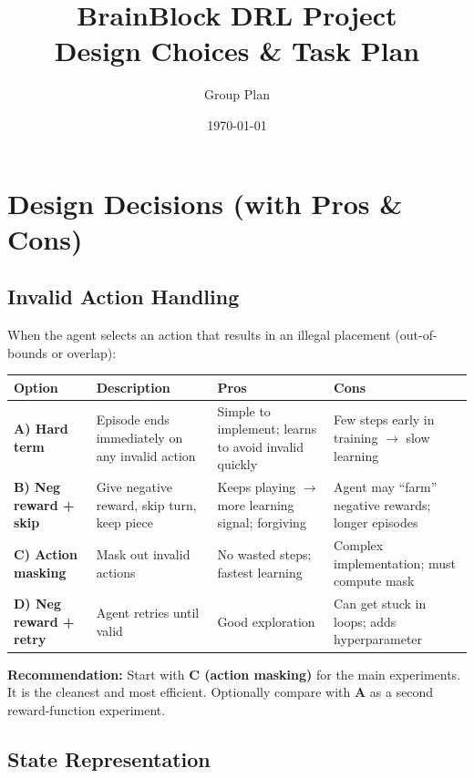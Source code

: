 \documentclass[11pt,a4paper]{article}
\title{\textbf{BrainBlock DRL Project}\\ \large Design Choices \& Task Plan}
\author{Group Plan}
\date{\today}
\begin{document}
\maketitle

\section{Design Decisions (with Pros \& Cons)}

\subsection{Invalid Action Handling}
When the agent selects an action that results in an illegal placement (out-of-bounds or overlap):

\vspace{0.5em}
\noindent
\begin{tabular}{|l|p{3.5cm}|p{3.5cm}|p{3.5cm}|}
\hline
\textbf{Option} & \textbf{Description} & \textbf{Pros} & \textbf{Cons} \\
\hline
\textbf{A) Hard term} & Episode ends immediately on any invalid action & Simple to implement; learns to avoid invalid quickly & Few steps early in training $\rightarrow$ slow learning \\
\hline
\textbf{B) Neg reward + skip} & Give negative reward, skip turn, keep piece & Keeps playing $\rightarrow$ more learning signal; forgiving & Agent may ``farm'' negative rewards; longer episodes \\
\hline
\textbf{C) Action masking} & Mask out invalid actions & No wasted steps; fastest learning & Complex implementation; must compute mask \\
\hline
\textbf{D) Neg reward + retry} & Agent retries until valid & Good exploration & Can get stuck in loops; adds hyperparameter \\
\hline
\end{tabular}

\textbf{Recommendation:} Start with \textbf{C (action masking)} for the main experiments. It is the cleanest and most efficient. Optionally compare with \textbf{A} as a second reward-function experiment.

\subsection{State Representation}
\end{document}
